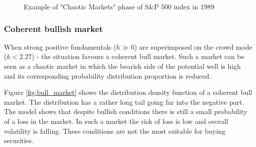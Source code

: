 \begin{figure}[h!]
	\setlength{\fboxsep}{0pt}
	\setlength{\fboxrule}{1pt}
  	\centering
  	\caption{Example of "Chaotic Markets" phase of S\&P  500 index in 1989}
  	\label{fig:SP_1989}
\end{figure}

\subsubsection*{Coherent bullish market}

When strong positive fundamentals ($h \gg 0$) are superimposed on the crowd mode ($k < 2.27$) - the situation favours a coherent bull market. Such a market can be seen as a chaotic market in which the bearish side of the potential well is high and its corresponding probability distribution proportion is reduced.

Figure \ref{fig:bull_market} shows the distribution density function of a coherent bull market. The distribution has a rather long tail going far into the negative part. The model shows that despite bullish conditions there is still a small probability of a loss in the market. In such a market the risk of loss is low and overall volatility is falling. These conditions are not the most suitable for buying securities.

